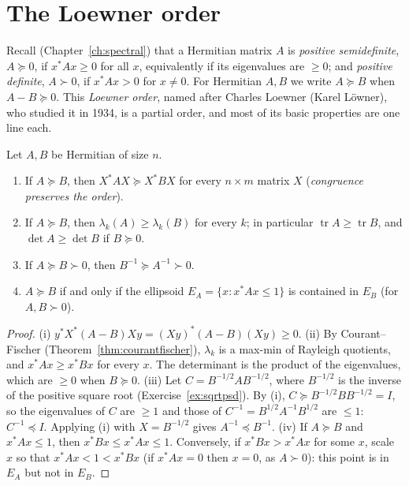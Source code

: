 \section{The Loewner order}

Recall (Chapter~\ref{ch:spectral}) that a Hermitian matrix $A$ is \emph{positive semidefinite}, $A\succeq0$, if $x^*Ax\ge0$ for all $x$,
equivalently if its eigenvalues are $\ge0$; and \emph{positive definite}, $A\succ0$, if $x^*Ax>0$ for $x\ne0$. For Hermitian $A,B$ we
write $A\succeq B$ when $A-B\succeq0$. This \emph{Loewner order}, named after Charles Loewner (Karel L\"owner), who studied it in 1934,
is a partial order, and most of its basic properties are one line each.

\begin{proposition}\label{prop:loewner}
Let $A,B$ be Hermitian of size $n$.
\begin{enumerate}[label=(\roman*)]
\item If $A\succeq B$, then $X^*AX\succeq X^*BX$ for every $n\times m$ matrix $X$ (\emph{congruence preserves the order}).
\item If $A\succeq B$, then $\lambda_k(A)\ge\lambda_k(B)$ for every $k$; in particular $\operatorname{tr}A\ge\operatorname{tr}B$, and
$\det A\ge\det B$ if $B\succeq0$.
\item If $A\succeq B\succ0$, then $B^{-1}\succeq A^{-1}\succ0$.
\item $A\succeq B$ if and only if the ellipsoid $E_A=\{x:x^*Ax\le1\}$ is contained in $E_B$ (for $A,B\succ0$).
\end{enumerate}
\end{proposition}
\begin{proof}
(i) $y^*X^*(A-B)Xy=(Xy)^*(A-B)(Xy)\ge0$. (ii) By Courant--Fischer (Theorem~\ref{thm:courantfischer}), $\lambda_k$ is a max-min of
Rayleigh quotients, and $x^*Ax\ge x^*Bx$ for every $x$. The determinant is the product of the eigenvalues, which are $\ge0$ when
$B\succeq0$. (iii) Let $C=B^{-1/2}AB^{-1/2}$, where $B^{-1/2}$ is the inverse of the positive square root (Exercise~\ref{ex:sqrtpsd}).
By (i), $C\succeq B^{-1/2}BB^{-1/2}=I$, so the eigenvalues of $C$ are $\ge1$ and those of $C^{-1}=B^{1/2}A^{-1}B^{1/2}$ are $\le1$: $C^{-1}
\preceq I$. Applying (i) with $X=B^{-1/2}$ gives $A^{-1}\preceq B^{-1}$. (iv) If $A\succeq B$ and $x^*Ax\le1$, then $x^*Bx\le x^*Ax\le1$.
Conversely, if $x^*Bx>x^*Ax$ for some $x$, scale $x$ so that $x^*Ax<1<x^*Bx$ (if $x^*Ax=0$ then $x=0$, as $A\succ0$): this point is
in $E_A$ but not in $E_B$.
\end{proof}

